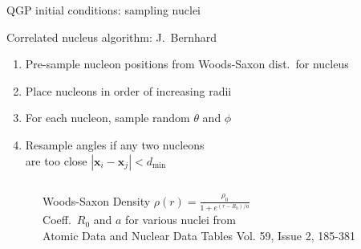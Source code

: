 \documentclass{beamer}
\newcommand{\lead}[1]{
  \node (position) at (8.8 cm, -5 cm) {\texttt{[image: \#1]}};
}
\begin{document}
\begin{frame}[t]{QGP initial conditions: sampling nuclei}

  {\color{theme} Correlated nucleus algorithm: J.\ Bernhard} \\
  \begin{enumerate}
    \small
    \item Pre-sample nucleon positions from Woods-Saxon dist.\ for nucleus
    \item Place nucleons in order of increasing radii
    \item For each nucleon, sample random $\theta$ and $\phi$ \\
    \item Resample angles if any two nucleons \\
          are too close $|\mathbf{x}_i - \mathbf{x}_j| < d_\mathrm{min}$
  \end{enumerate}

  \begin{columns}
    \begin{column}{.05\textwidth}
    \end{column}
    \begin{column}{.45\textwidth}
      \medskip
      \begin{block}{\centering\small Woods-Saxon Density}
        \medskip
        \centering\small $\displaystyle \rho(r) = \frac{\rho_0}{1 + e^{(r - R_0)/a}}$ \\[2ex]
        \scriptsize Coeff.\ $R_0$ and $a$ for various nuclei from \\
        \textcolor{theme}{Atomic Data and Nuclear Data Tables Vol. 59, Issue 2, 185-381} 
        \smallskip
      \end{block}
    \end{column}
    \begin{column}{.5\textwidth}
    \end{column}
  \end{columns}
\end{frame}
\end{document}
